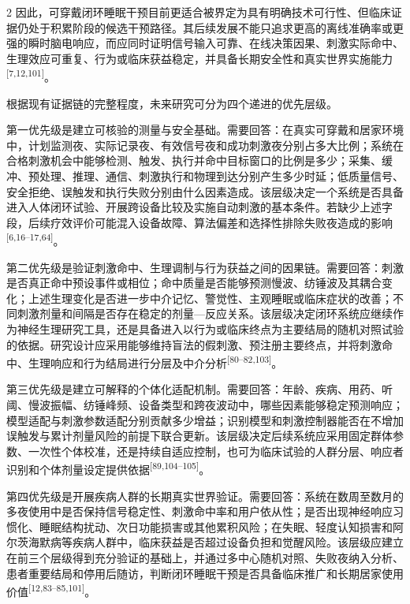 \documentclass[UTF8,zihao=5,fontset=none]{ctexart}
\newcommand{\hei}{\CJKfamily{hei}}
\newcommand{\leveltwo}[1]{%
  \par\noindent{\hei\fontsize{10pt}{12pt}\selectfont\bfseries #1\par}}
\newcommand{\refcite}[1]{\nolinebreak[4]\textsuperscript{[#1]}}
\begin{document}
\begin{multicols}{2}
因此，可穿戴闭环睡眠干预目前更适合被界定为具有明确技术可行性、但临床证据仍处于积累阶段的候选干预路径。其后续发展不能只追求更高的离线准确率或更强的瞬时脑电响应，而应同时证明信号输入可靠、在线决策因果、刺激实际命中、生理效应可重复、行为或临床获益稳定，并具备长期安全性和真实世界实施能力\refcite{7,12,101}。\par

\leveltwo{7.2 优先研究问题及决策意义}

根据现有证据链的完整程度，未来研究可分为四个递进的优先层级。\par

第一优先级是建立可核验的测量与安全基础。需要回答：在真实可穿戴和居家环境中，计划监测夜、实际记录夜、有效信号夜和成功刺激夜分别占多大比例；系统在合格刺激机会中能够检测、触发、执行并命中目标窗口的比例是多少；采集、缓冲、预处理、推理、通信、刺激执行和物理到达分别产生多少时延；低质量信号、安全拒绝、误触发和执行失败分别由什么因素造成。该层级决定一个系统是否具备进入人体闭环试验、开展跨设备比较及实施自动刺激的基本条件。若缺少上述字段，后续疗效评价可能混入设备故障、算法偏差和选择性排除失败夜造成的影响\refcite{6,16--17,64}。\par

第二优先级是验证刺激命中、生理调制与行为获益之间的因果链。需要回答：刺激是否真正命中预设事件或相位；命中质量是否能够预测慢波、纺锤波及其耦合变化；上述生理变化是否进一步中介记忆、警觉性、主观睡眠或临床症状的改善；不同刺激剂量和间隔是否存在稳定的剂量—反应关系。该层级决定闭环系统应继续作为神经生理研究工具，还是具备进入以行为或临床终点为主要结局的随机对照试验的依据。研究设计应采用能够维持盲法的假刺激、预注册主要终点，并将刺激命中、生理响应和行为结局进行分层及中介分析\refcite{80--82,103}。\par

第三优先级是建立可解释的个体化适配机制。需要回答：年龄、疾病、用药、听阈、慢波振幅、纺锤峰频、设备类型和跨夜波动中，哪些因素能够稳定预测响应；模型适配与刺激参数适配分别贡献多少增益；识别模型和刺激控制器能否在不增加误触发与累计剂量风险的前提下联合更新。该层级决定后续系统应采用固定群体参数、一次性个体校准，还是持续自适应控制，也可为临床试验的人群分层、响应者识别和个体剂量设定提供依据\refcite{89,104--105}。\par

第四优先级是开展疾病人群的长期真实世界验证。需要回答：系统在数周至数月的多夜使用中是否保持信号稳定性、刺激命中率和用户依从性；是否出现神经响应习惯化、睡眠结构扰动、次日功能损害或其他累积风险；在失眠、轻度认知损害和阿尔茨海默病等疾病人群中，临床获益是否超过设备负担和觉醒风险。该层级应建立在前三个层级得到充分验证的基础上，并通过多中心随机对照、失败夜纳入分析、患者重要结局和停用后随访，判断闭环睡眠干预是否具备临床推广和长期居家使用价值\refcite{12,83--85,101}。\par


\end{multicols}
\end{document}
